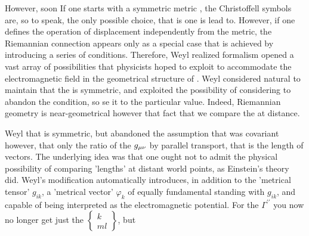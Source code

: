 \documentclass[draft]{article}
\begin{document}
However, soon If one starts with a symmetric metric \gmn, the Christoffell symbols are, so to speak, the only possible choice, that is one is lead to. However, if one defines the operation of displacement independently from the metric, the Riemannian connection appears only as a special case that is achieved by introducing a series of conditions. Therefore, Weyl realized formalism opened a vast array of possibilities that physicists hoped to exploit to accommodate the electromagnetic field in the geometrical structure of \spti. Weyl considered natural to maintain that the is symmetric, and exploited the possibility of considering to abandon the condition, so se it to the particular value. Indeed, Riemannian geometry is near-geometrical however that fact that we compare the at distance. 



Weyl that is symmetric, but abandoned the assumption that was covariant however, that only the ratio of the $g_{\mu\nu}$ by parallel transport, that is the length of vectors. The underlying idea was that one ought not to admit the physical possibility of comparing 'lengths' at distant world points, as Einstein's theory did. Weyl's modification automatically introduces, in addition to the 'metrical tensor' $g_{i k}$, a 'metrical vector' $\varphi_{k}$ of equally fundamental standing with $g_{i k}$, and capable of being interpreted as the electromagnetic potential. For the $\Gamma^{\prime \prime}$ you now no longer get just the $\left\{\begin{array}{c}k \\ m l\end{array}\right\}$, but
\end{document}
